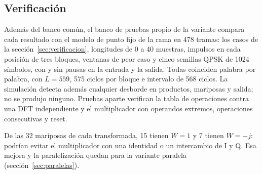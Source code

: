 \subsection{Verificación}

Además del banco común, el banco de pruebas propio de la variante compara cada resultado con el modelo de punto fijo de la rama en 478 tramas: los casos de la sección~\ref{sec:verificacion}, longitudes de 0 a 40 muestras, impulsos en cada posición de tres bloques, ventanas de peor caso y cinco semillas QPSK de 1024 símbolos, con y sin pausas en la entrada y la salida. Todas coinciden palabra por palabra, con $L = 559$, 575 ciclos por bloque e intervalo de 568 ciclos. La simulación detecta además cualquier desborde en productos, mariposas y salida; no se produjo ninguno. Pruebas aparte verifican la tabla de operaciones contra una DFT independiente y el multiplicador con operandos extremos, operaciones consecutivas y reset.

De las 32 mariposas de cada transformada, 15 tienen $W = 1$ y 7 tienen $W = -j$: podrían evitar el multiplicador con una identidad o un intercambio de I y Q. Esa mejora y la paralelización quedan para la variante paralela (sección~\ref{sec:paralelas}).
